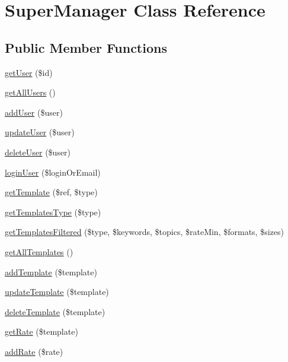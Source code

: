 \hypertarget{classSuperManager}{}\section{Super\+Manager Class Reference}
\label{classSuperManager}
\subsection*{Public Member Functions}
\begin{DoxyCompactItemize}
\item 
\hyperlink{classSuperManager_a6a3faf8b26e39f4aa770f089b79b16cf}{get\+User} (\$id)
\item 
\hyperlink{classSuperManager_a1d13928519ef298511689f791ee20f47}{get\+All\+Users} ()
\item 
\hyperlink{classSuperManager_a36f1355d1470e77499029fb5c6f56c2f}{add\+User} (\$user)
\item 
\hyperlink{classSuperManager_a63a861b2c5f5ada719d52cf5cd2c0456}{update\+User} (\$user)
\item 
\hyperlink{classSuperManager_a64aafcafe1766f790b153795a17cca31}{delete\+User} (\$user)
\item 
\hyperlink{classSuperManager_a23df055dc5d05de1826ca6b410412e1a}{login\+User} (\$login\+Or\+Email)
\item 
\hyperlink{classSuperManager_a893c2c2ec7efa813fb38fcd6dfa4e91f}{get\+Template} (\$ref, \$type)
\item 
\hyperlink{classSuperManager_a2d46a844089eaf6ddf7d834847cae4b4}{get\+Templates\+Type} (\$type)
\item 
\hyperlink{classSuperManager_ae7029ae4b0db353b9be8088bc30647eb}{get\+Templates\+Filtered} (\$type, \$keywords, \$topics, \$rate\+Min, \$formats, \$sizes)
\item 
\hyperlink{classSuperManager_a2815b1d6986d42f6581c48460df37b7f}{get\+All\+Templates} ()
\item 
\hyperlink{classSuperManager_a4afbfc75b1ee34099199da2fa0915c0e}{add\+Template} (\$template)
\item 
\hyperlink{classSuperManager_a28caeb179b7e020bbfec742abdeae1df}{update\+Template} (\$template)
\item 
\hyperlink{classSuperManager_a2d701d156bcaa8d6fa546210469541fb}{delete\+Template} (\$template)
\item 
\hyperlink{classSuperManager_ae16e3a2d6fd7f0cca136eb75ea4c8d49}{get\+Rate} (\$template)
\item 
\hyperlink{classSuperManager_ae96f4d649dbdcff2d160150b32aefea6}{add\+Rate} (\$rate)

\end{DoxyCompactItemize}
